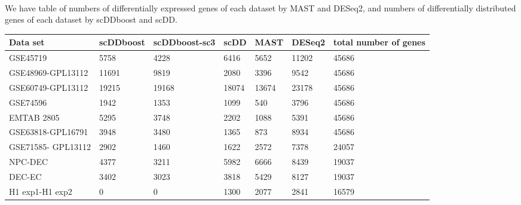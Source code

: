 \documentclass[11pt]{amsart}
\begin{document}
\hfill\\
We have table of numbers of differentially expressed genes of each dataset by MAST and DESeq2, and numbers of differentially distributed genes of each dataset by scDDboost and scDD.\\

\begin{table}[ht]
\centering
\begin{tabular}{ |p{2cm}|p{2cm}|p{2cm}|p{2cm}|p{2cm}|p{2cm}|p{2cm}|}
\hline
Data set & scDDboost & scDDboost-sc3 & scDD & MAST & DESeq2 & total number of genes\\
\hline
\hline
GSE45719 & 5758 & 4228 & 6416 &5652 & 11202 & 45686\\
\hline
GSE48969-GPL13112 & 11691 & 9819 & 2080 & 3396 & 9542 & 45686\\
\hline
GSE60749-GPL13112 & 19215 & 19168 &  18074 & 13674 & 23178 & 45686\\
\hline
GSE74596 & 1942 & 1353 & 1099 & 540 & 3796 & 45686\\
\hline
EMTAB 2805 & 5295 & 3748 & 2202 & 1088 & 5391 & 45686\\
\hline
GSE63818-GPL16791 & 3948 & 3480 & 1365 & 873 & 8934 & 45686\\
\hline
GSE71585- GPL13112 & 2902 & 1460 & 1622 & 2572 & 7378 & 24057 \\
\hline
NPC-DEC & 4377 & 3211 & 5982 & 6666 & 8439 & 19037\\
\hline
DEC-EC & 3402 & 3023 & 3818 & 5429 & 8127 & 19037\\
\hline
H1 exp1-H1 exp2 &  0 & 0 & 1300 & 2077 & 2841 & 16579\\
\hline
\end{tabular}
\end{table}
\end{document}
